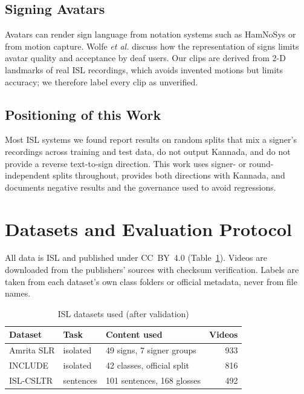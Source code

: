 \documentclass[conference]{IEEEtran}
\begin{document}
\subsection{Signing Avatars}
Avatars can render sign language from notation systems such as HamNoSys \cite{hanke2004hamnosys} or from motion capture. Wolfe \textit{et al.} \cite{wolfe2022avatars} discuss how the representation of signs limits avatar quality and acceptance by deaf users. Our clips are derived from 2-D landmarks of real ISL recordings, which avoids invented motions but limits accuracy; we therefore label every clip as unverified.

\subsection{Positioning of this Work}
Most ISL systems we found report results on random splits that mix a signer's recordings across training and test data, do not output Kannada, and do not provide a reverse text-to-sign direction. This work uses signer- or round-independent splits throughout, provides both directions with Kannada, and documents negative results and the governance used to avoid regressions.

\section{Datasets and Evaluation Protocol}
All data is ISL and published under CC~BY~4.0 (Table~\ref{tab:data}). Videos are downloaded from the publishers' sources with checksum verification. Labels are taken from each dataset's own class folders or official metadata, never from file names.

\begin{table}[t]
\caption{ISL datasets used (after validation)}
\label{tab:data}
\centering
\begin{tabular}{@{}lllr@{}}
\toprule
Dataset & Task & Content used & Videos \\
\midrule
Amrita SLR \cite{amrita2023} & isolated & 49 signs, 7 signer groups & 933 \\
INCLUDE \cite{sridhar2020include} & isolated & 42 classes, official split & 816 \\
ISL-CSLTR \cite{elakkiya2021csltr} & sentences & 101 sentences, 168 glosses & 492 \\
\bottomrule
\end{tabular}
\end{table}
\end{document}
